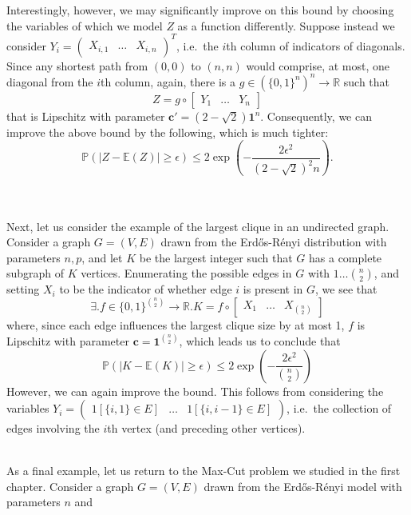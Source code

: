 	Interestingly, however, we may significantly improve on this bound by choosing the 
	variables of which we model $Z$ as a function differently. Suppose instead we consider 
	$Y_i = \begin{pmatrix} X_{i, 1} & \hdots & X_{i, n} \end{pmatrix}^T$, i.e.\ the $i$th column 
	of indicators of diagonals. Since any shortest path from $(0,0)$ to $(n,n)$ would comprise,
	at most, one diagonal from the $i$th column, again, there is a $g \in \left(\{0,1\}^{n}
	\right)^n \rightarrow \mathbb{R}$ such that 
	$$
		Z = g \circ \begin{bmatrix} Y_1 & \hdots & Y_n \end{bmatrix}
	$$
	that is Lipschitz with parameter $\mathbf{c}' = (2-\sqrt 2) \mathbf{1}^{n}$. Consequently,
	we can improve the above bound by the following, which is much tighter:
	$$
		\mathbb{P}(|Z-\mathbb{E}(Z)| \geq \epsilon) \leq 
		2 \exp \left(-\frac{2\epsilon^2}{(2-\sqrt 2)^2 n}\right).
	$$
	\ \\ \ \par
	Next, let us consider the example of the largest clique in an undirected graph. 
	Consider a graph $G = (V, E)$ drawn from the Erd\H{o}s-R\'enyi distribution with parameters
	$n,p$, and let $K$ be the largest integer such that $G$ has a complete subgraph of $K$
	vertices. Enumerating the possible edges in $G$ with $1 \hdots \binom{n}{2}$, and setting 
	$X_i$ to be the indicator of whether edge $i$ is present in $G$, we see that
	$$		
		\exists. f \in \{0,1\}^{\binom n 2} \rightarrow \mathbb{R} . 
		K = f \circ \begin{bmatrix} X_1 & \hdots & X_{\binom n 2 } \end{bmatrix}
	$$
	where, since each edge influences  the largest clique size by at most 1, $f$ is Lipschitz 
	with parameter $\mathbf{c} = \mathbf{1}^{\binom n 2}$, which leads us to conclude that 
	$$
		\mathbb{P}(|K - \mathbb{E}(K)| \geq \epsilon) \leq
		2 \exp\left(- \frac{2\epsilon^2}{\binom n 2}\right)
	$$
	However, we can again improve the bound. This follows from considering the variables
	$Y_i = \begin{pmatrix} 1[\{i,1\} \in E] & \hdots & 1[\{i, i-1\} \in E] \end{pmatrix}$,
	i.e.\ the collection of edges involving the $i$th vertex (and preceding other vertices).
	\ \\ \ \par
	As a final example, let us return to the Max-Cut problem we studied in the first chapter. 
	Consider a graph $G = (V,E)$ drawn from the Erd\H{o}s-R\'enyi model with parameters $n$ and 
